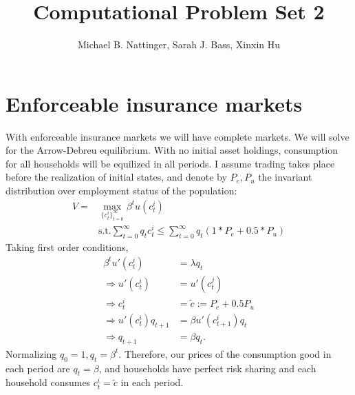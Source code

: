 \documentclass[11pt]{article} %
\title{Computational Problem Set 2}
\author{Michael B. Nattinger, Sarah J. Bass, Xinxin Hu}
\begin{document}
\maketitle

\section{Enforceable insurance markets}
With enforceable insurance markets we will have complete markets. We will solve for the Arrow-Debreu equilibrium. With no initial asset holdings, consumption for all households will be equilized in all periods. I assume trading takes place before the realization of initial states, and denote by $P_e,P_u$ the invariant distribution over employment status of the population:
\begin{align*}
V = &\max_{\{c_t^i\}_{t=0}^{\infty}} \beta^t u(c_t^i) \\
&\text{s.t.} \sum_{t=0}^{\infty} q_t c_t^i \leq \sum_{t=0}^{\infty}q_t(1*P_{e} + 0.5*P_{u})
\end{align*}
Taking first order conditions,
\begin{align*}
\beta^t u'(c_t^i) &= \lambda q_t \\
\Rightarrow u'(c_t^i) &= u'(c_t^j)\\
\Rightarrow c_t^i &= \tilde{c} := P_e + 0.5P_u \\
\Rightarrow u'(c_t^i) q_{t+1} &= \beta u'(c_{t+1}^i) q_{t} \\
\Rightarrow q_{t+1} &= \beta q_t.
\end{align*}
Normalizing $q_0 = 1, q_t = \beta^t$. Therefore, our prices of the consumption good in each period are $q_t = \beta$, and households have perfect risk sharing and each household consumes $c_t^i = \tilde{c}$ in each period.
\end{document}
